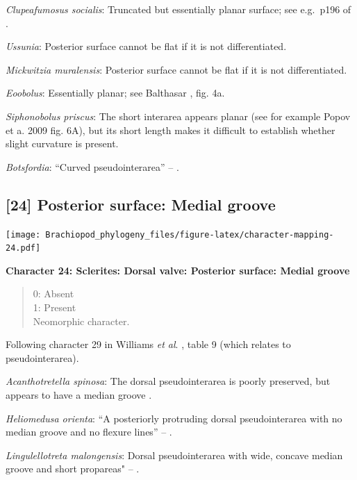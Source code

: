 \documentclass[]{book}
\theoremstyle{definition}
\theoremstyle{definition}
\theoremstyle{definition}
\theoremstyle{remark}
\begin{document}
\emph{Clupeafumosus socialis}: Truncated but essentially planar surface;
see e.g.~p196 of \citet{Topper2013Reappraisalof}.

\emph{Ussunia}: Posterior surface cannot be flat if it is not
differentiated.

\emph{Mickwitzia muralensis}: Posterior surface cannot be flat if it is
not differentiated.

\emph{Eoobolus}: Essentially planar; see Balthasar
\citeyearpar{Balthasar2009Thebrachiopod}, fig. 4a.

\emph{Siphonobolus priscus}: The short interarea appears planar (see for
example Popov et a. 2009 fig. 6A), but its short length makes it
difficult to establish whether slight curvature is present.

\emph{Botsfordia}: ``Curved pseudointerarea'' --
\citet{Skovsted2017Depthrelated}.

\hypertarget{posterior-surface-medial-groove}{%
\subsection*{{[}24{]} Posterior surface: Medial
groove}\label{posterior-surface-medial-groove}}

\texttt{[image: Brachiopod\_phylogeny\_files/figure-latex/character-mapping-24.pdf]}

\textbf{Character 24: Sclerites: Dorsal valve: Posterior surface: Medial
groove}

\begin{quote}
0: Absent\\
1: Present\\
Neomorphic character.
\end{quote}

Following character 29 in Williams \emph{et al}.
\citeyearpar{Williams2000BrachiopodaLinguliformea}, table 9 (which
relates to pseudointerarea).

\emph{Acanthotretella spinosa}: The dorsal pseudointerarea is poorly
preserved, but appears to have a median groove
\citep{Holmer2006Aspinose}.

\emph{Heliomedusa orienta}: ``A posteriorly protruding dorsal
pseudointerarea with no median groove and no flexure lines'' --
\citet{Chen2007Reinterpretationof}.

\emph{Lingulellotreta malongensis}: Dorsal pseudointerarea with wide,
concave median groove and short propareas" --
\citet{Williams2000BrachiopodaLinguliformea}.
\end{document}
